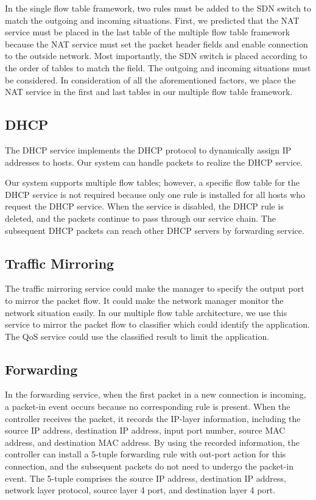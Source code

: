 \documentclass[conference]{IEEEtran}
\begin{document}
In the single flow table framework, two rules must be added to the SDN switch to match the outgoing and incoming situations.
First, we predicted that the NAT service must be placed in the last table of the multiple flow table framework because the NAT service must set the packet header fields and enable connection to the outside network.
Most importantly, the SDN switch is placed according to the order of tables to match the field.
The outgoing and incoming situations must be considered.
In consideration of all the aforementioned factors, we place the NAT service in the first and last tables in our multiple flow table framework.



\subsection{DHCP}
The DHCP service implements the DHCP protocol to dynamically assign IP addresses to hosts.
Our system can handle packets to realize the DHCP service.


Our system supports multiple flow tables; however, a specific flow table for the DHCP service is not required because only one rule is installed for all hosts who request the DHCP service.
When the service is disabled, the DHCP rule is deleted, and the packets continue to pass through our service chain.
The subsequent DHCP packets can reach other DHCP servers by forwarding service.



\subsection{Traffic Mirroring} \label{ssec:mirror}
The traffic mirroring service could make the manager to specify the output port to mirror the packet flow.
It could make the network manager monitor the network situation easily.
In our multiple flow table architecture, we use this service to mirror the packet flow to classifier which could identify the application.
The QoS service could use the classified result to limit the application.



\subsection{Forwarding} \label{ssec:forwarding}
In the forwarding service, when the first packet in a new connection is incoming, a packet-in event occurs because no corresponding rule is present.
When the controller receives the packet, it records the IP-layer information, including the source IP address, destination IP address, input port number, source MAC address, and destination MAC address.
By using the recorded information, the controller can install a 5-tuple forwarding rule with out-port action for this connection, and the subsequent packets do not need to undergo the packet-in event.
The 5-tuple comprises the source IP address, destination IP address, network layer protocol, source layer 4 port, and destination layer 4 port.
\end{document}
